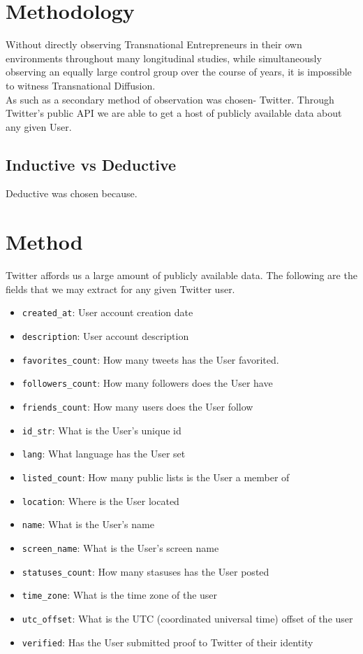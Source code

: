 \section{Methodology}
Without directly observing Transnational Entrepreneurs in their own environments throughout many longitudinal studies, while simultaneously observing an equally large control group over the course of years, it is impossible to witness Transnational Diffusion.
\\
As such as a secondary method of observation was chosen- Twitter. Through Twitter's public API we are able to get a host of publicly available data about any given User.

\subsection{Inductive vs Deductive}
Deductive was chosen because.

\section{Method}
Twitter affords us a large amount of publicly available data. The following are the fields that we may extract for any given Twitter user.

\begin{itemize}
\item \verb|created_at|: User account creation date
\item \verb|description|: User account description
\item \verb|favorites_count|: How many tweets has the User favorited.
\item \verb|followers_count|: How many followers does the User have
\item \verb|friends_count|: How many users does the User follow
\item \verb|id_str|: What is the User's unique id
\item \verb|lang|: What language has the User set
\item \verb|listed_count|: How many public lists is the User a member of
\item \verb|location|: Where is the User located
\item \verb|name|: What is the User's name
\item \verb|screen_name|: What is the User's screen name
\item \verb|statuses_count|: How many stasuses has the User posted
\item \verb|time_zone|: What is the time zone of the user
\item \verb|utc_offset|: What is the UTC (coordinated universal time) offset of the user
\item \verb|verified|: Has the User submitted proof to Twitter of their identity
\end{itemize}


